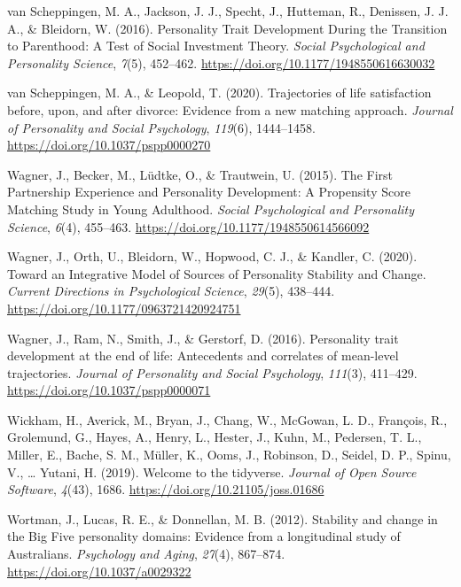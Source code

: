 \documentclass[
  english,
  man, noextraspace]{apa7}
\begin{document}
\leavevmode\hypertarget{ref-vanscheppingenPersonalityTraitDevelopment2016}{}%
van Scheppingen, M. A., Jackson, J. J., Specht, J., Hutteman, R., Denissen, J. J. A., \& Bleidorn, W. (2016). Personality Trait Development During the Transition to Parenthood: A Test of Social Investment Theory. \emph{Social Psychological and Personality Science}, \emph{7}(5), 452--462. \url{https://doi.org/10.1177/1948550616630032}

\leavevmode\hypertarget{ref-vanscheppingenTrajectoriesLifeSatisfaction2020}{}%
van Scheppingen, M. A., \& Leopold, T. (2020). Trajectories of life satisfaction before, upon, and after divorce: Evidence from a new matching approach. \emph{Journal of Personality and Social Psychology}, \emph{119}(6), 1444--1458. \url{https://doi.org/10.1037/pspp0000270}

\leavevmode\hypertarget{ref-wagnerFirstPartnershipExperience2015}{}%
Wagner, J., Becker, M., Lüdtke, O., \& Trautwein, U. (2015). The First Partnership Experience and Personality Development: A Propensity Score Matching Study in Young Adulthood. \emph{Social Psychological and Personality Science}, \emph{6}(4), 455--463. \url{https://doi.org/10.1177/1948550614566092}

\leavevmode\hypertarget{ref-wagnerIntegrativeModelSources2020}{}%
Wagner, J., Orth, U., Bleidorn, W., Hopwood, C. J., \& Kandler, C. (2020). Toward an Integrative Model of Sources of Personality Stability and Change. \emph{Current Directions in Psychological Science}, \emph{29}(5), 438--444. \url{https://doi.org/10.1177/0963721420924751}

\leavevmode\hypertarget{ref-wagnerPersonalityTraitDevelopment2016}{}%
Wagner, J., Ram, N., Smith, J., \& Gerstorf, D. (2016). Personality trait development at the end of life: Antecedents and correlates of mean-level trajectories. \emph{Journal of Personality and Social Psychology}, \emph{111}(3), 411--429. \url{https://doi.org/10.1037/pspp0000071}

\leavevmode\hypertarget{ref-tidyverse2019}{}%
Wickham, H., Averick, M., Bryan, J., Chang, W., McGowan, L. D., François, R., Grolemund, G., Hayes, A., Henry, L., Hester, J., Kuhn, M., Pedersen, T. L., Miller, E., Bache, S. M., Müller, K., Ooms, J., Robinson, D., Seidel, D. P., Spinu, V., \ldots{} Yutani, H. (2019). Welcome to the tidyverse. \emph{Journal of Open Source Software}, \emph{4}(43), 1686. \url{https://doi.org/10.21105/joss.01686}

\leavevmode\hypertarget{ref-wortmanStabilityChangeBig2012}{}%
Wortman, J., Lucas, R. E., \& Donnellan, M. B. (2012). Stability and change in the Big Five personality domains: Evidence from a longitudinal study of Australians. \emph{Psychology and Aging}, \emph{27}(4), 867--874. \url{https://doi.org/10.1037/a0029322}
\end{document}

